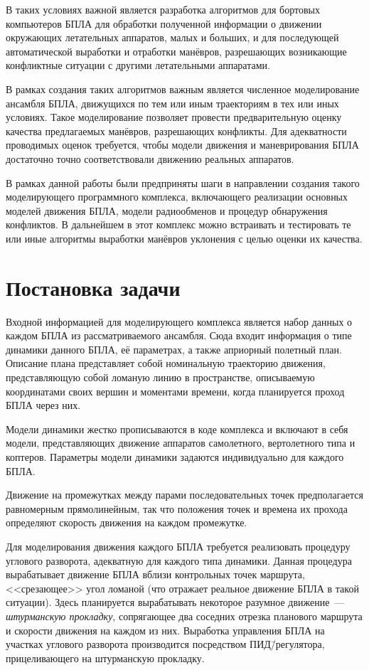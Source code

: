 \documentclass[a4paper,12pt]{article}
\begin{document}
В таких условиях важной является разработка алгоритмов для бортовых компьютеров БПЛА для обработки полученной информации о движении окружающих летательных аппаратов, малых и больших, и для последующей автоматической выработки и отработки манёвров, разрешающих возникающие конфликтные ситуации с другими летательными аппаратами. 

В рамках создания таких алгоритмов важным является численное моделирование ансамбля БПЛА, движущихся по тем или иным траекториям в тех или иных условиях. Такое моделирование позволяет провести предварительную оценку качества предлагаемых манёвров, разрешающих конфликты. Для адекватности проводимых оценок требуется, чтобы модели движения и маневрирования БПЛА достаточно точно соответствовали движению реальных аппаратов. 

В рамках данной работы были предприняты шаги в направлении создания такого моделирующего программного комплекса, включающего реализации основных моделей движения БПЛА, модели радиообменов и процедур обнаружения конфликтов. В дальнейшем в этот комплекс можно встраивать и тестировать те или иные алгоритмы выработки манёвров уклонения с целью оценки их качества.

\newpage

\section{Постановка задачи}

Входной информацией для моделирующего комплекса является набор данных о каждом БПЛА из рассматриваемого ансамбля. Сюда входит информация о типе динамики данного БПЛА, её параметрах, а также априорный полетный план. Описание плана представляет собой номинальную траекторию движения, представляющую собой ломаную линию в пространстве, описываемую координатами своих вершин и моментами времени, когда планируется проход БПЛА через них.

Модели динамики жестко прописываются в коде комплекса и включают в себя модели, представляющих движение аппаратов самолетного, вертолетного типа и коптеров. Параметры модели динамики задаются индивидуально для каждого БПЛА.

Движение на промежутках между парами последовательных точек предполагается равномерным прямолинейным, так что положения точек и времена их прохода определяют скорость движения на каждом промежутке. 

Для моделирования движения каждого БПЛА требуется реализовать процедуру углового разворота, адекватную для каждого типа динамики. Данная процедура вырабатывает движение БПЛА вблизи контрольных точек маршрута, <<срезающее>> угол ломаной (что отражает реальное движение БПЛА в такой ситуации). Здесь планируется вырабатывать некоторое разумное движение~--- \textit{штурманскую прокладку}, сопрягающее два соседних отрезка планового маршрута и скорости движения на каждом из них. Выработка управления БПЛА на участках углового разворота производится посредством ПИД\=/регулятора, прицеливающего на штурманскую прокладку.
\end{document}
